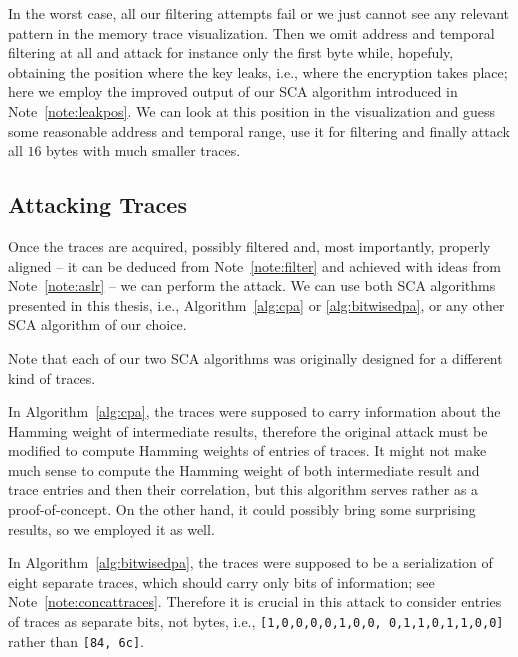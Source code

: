 		In the worst case, all our filtering attempts fail or we just cannot see any relevant pattern in the memory trace visualization. Then we omit address and temporal filtering at all and attack for instance only the first byte while, hopefuly, obtaining the position where the key leaks, i.e., where the encryption takes place; here we employ the improved output of our SCA algorithm introduced in Note~\ref{note:leakpos}. We can look at this position in the visualization and guess some reasonable address and temporal range, use it for filtering and finally attack all $16$ bytes with much smaller traces.



\subsection{Attacking Traces}
\label{sec:attack}

Once the traces are acquired, possibly filtered and, most importantly, properly aligned -- it can be deduced from Note~\ref{note:filter} and achieved with ideas from Note~\ref{note:aslr} -- we can perform the attack. We can use both SCA algorithms presented in this thesis, i.e., Algorithm~\ref{alg:cpa} or \ref{alg:bitwisedpa}, or any other SCA algorithm of our choice.

\begin{remark}
\label{rem:traceformat}
	Note that each of our two SCA algorithms was originally designed for a different kind of traces.
	
	In Algorithm~\ref{alg:cpa}, the traces were supposed to carry information about the Hamming weight of intermediate results, therefore the original attack must be modified to compute Hamming weights of entries of traces. It might not make much sense to compute the Hamming weight of both intermediate result and trace entries and then their correlation, but this algorithm serves rather as a proof-of-concept. On the other hand, it could possibly bring some surprising results, so we employed it as well.
	
	In Algorithm~\ref{alg:bitwisedpa}, the traces were supposed to be a serialization of eight separate traces, which should carry only bits of information; see Note~\ref{note:concattraces}. Therefore it is crucial in this attack to consider entries of traces as separate bits, not bytes, i.e., {\tt [1,0,0,0,0,1,0,0, 0,1,1,0,1,1,0,0]} rather than {\tt [84, 6c]}.
\end{remark}

